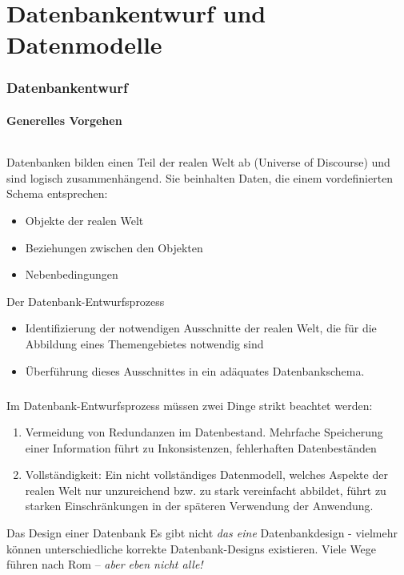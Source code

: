 \part{Datenbankentwurf und Datenmodelle}
\label{part:relmod}

\section{Datenbankentwurf}
\subsection{Generelles Vorgehen}

\begin{frame}{\insertsection}
\framesubtitle{\insertsubsection}
Datenbanken bilden einen Teil der realen Welt ab (Universe of Discourse) und sind logisch zusammenhängend. Sie beinhalten Daten, die einem vordefinierten Schema entsprechen: 
\begin{itemize}
	\item Objekte der realen Welt 
	\item Beziehungen zwischen den Objekten
	\item Nebenbedingungen
\end{itemize}

\begin{block}{Der Datenbank-Entwurfsprozess}
	\begin{itemize}
		\item Identifizierung der notwendigen Ausschnitte der realen Welt, die für die Abbildung eines Themengebietes notwendig sind
		\item Überführung dieses Ausschnittes in ein adäquates Datenbankschema.
	\end{itemize}
\end{block}
\end{frame}


\begin{frame}\frametitle{\insertsection}
\alert{Im Datenbank-Entwurfsprozess müssen zwei Dinge strikt beachtet werden:}
\begin{enumerate}
\item Vermeidung von Redundanzen im Datenbestand. Mehrfache Speicherung einer Information führt zu Inkonsistenzen, fehlerhaften Datenbeständen
\item Vollständigkeit: Ein nicht vollständiges Datenmodell, welches Aspekte der realen Welt nur unzureichend bzw. zu stark vereinfacht abbildet, führt zu starken Einschränkungen in der späteren Verwendung der Anwendung.
\end{enumerate}

\begin{block}{Das Design einer Datenbank}
Es gibt nicht \textit{das eine} Datenbankdesign - vielmehr können unterschiedliche korrekte Datenbank-Designs existieren. 
Viele Wege führen nach Rom -- \textit{aber eben nicht alle!}
\end{block}
\end{frame}



